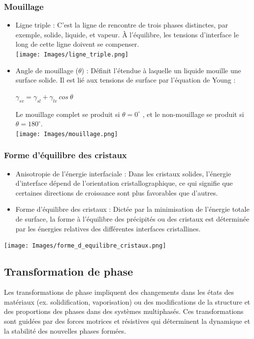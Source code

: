 \documentclass{article}
\begin{document}
        \subsubsection{Mouillage}
        \begin{itemize}
            \item Ligne triple : C'est la ligne de rencontre de trois phases distinctes, par exemple, solide, liquide, et vapeur. À l'équilibre, les tensions d'interface le long de cette ligne doivent se compenser. \\
            \texttt{[image: Images/ligne\_triple.png]}
            \item Angle de mouillage ($\theta$) : Définit l'étendue à laquelle un liquide mouille une surface solide. Il est lié aux tensions de surface par l'équation de Young :
            \begin{center}
                $\gamma_{sv} = \gamma_{sl} + \gamma_{lv} \: cos \: \theta$
            \end{center}
            Le mouillage complet se produit si $\theta = 0^\circ$ , et le non-mouillage se produit si $\theta = 180^\circ$. \\
                \texttt{[image: Images/mouillage.png]}
        \end{itemize}
        \pagebreak
        
        \subsubsection{Forme d'équilibre des cristaux}
        \begin{itemize}
            \item Anisotropie de l'énergie interfaciale : Dans les cristaux solides, l'énergie d'interface dépend de l'orientation cristallographique, ce qui signifie que certaines directions de croissance sont plus favorables que d'autres.
            \item Forme d'équilibre des cristaux : Dictée par la minimisation de l'énergie totale de surface, la forme à l'équilibre des précipités ou des cristaux est déterminée par les énergies relatives des différentes interfaces cristallines.
        \end{itemize}
            \texttt{[image: Images/forme\_d\_equilibre\_cristaux.png]}
    \pagebreak
    
    \subsection{Transformation de phase}
    Les transformations de phase impliquent des changements dans les états des matériaux (ex. solidification, vaporisation) ou des modifications de la structure et des proportions des phases dans des systèmes multiphasés. Ces transformations sont guidées par des forces motrices et résistives qui déterminent la dynamique et la stabilité des nouvelles phases formées.
\end{document}

